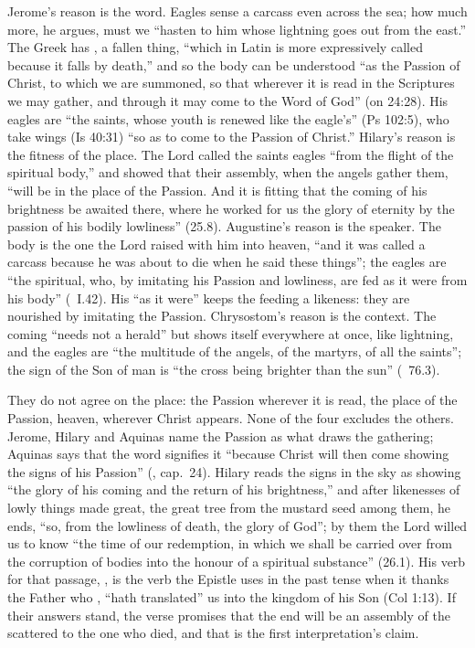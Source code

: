 Jerome's reason is the word. Eagles sense a carcass even across the sea; how
much more, he argues, must we ``hasten to him whose lightning goes out from
the east.'' The Greek has , a fallen thing, ``which in Latin is
more expressively called  because it falls by death,'' and so
the body can be understood ``as the Passion of Christ, to which we are
summoned, so that wherever it is read in the Scriptures we may gather, and
through it may come to the Word of God'' (on 24:28). His eagles are ``the
saints, whose youth is renewed like the eagle's'' (Ps 102:5), who take wings
(Is 40:31) ``so as to come to the Passion of Christ.'' Hilary's reason is the
fitness of the place. The Lord called the saints eagles ``from the flight of
the spiritual body,'' and showed that their assembly, when the angels gather
them, ``will be in the place of the Passion. And it is fitting that the coming
of his brightness be awaited there, where he worked for us the glory of
eternity by the passion of his bodily lowliness'' (25.8). Augustine's reason
is the speaker. The body is the one the Lord raised with him into heaven, ``and
it was called a carcass because he was about to die when he said these
things''; the eagles are ``the spiritual, who, by imitating his Passion and
lowliness, are fed as it were from his body'' (~I.42). His ``as it were'' keeps the feeding a likeness: they are
nourished by imitating the Passion. Chrysostom's reason is the context. The
coming ``needs not a herald'' but shows itself everywhere at once, like
lightning, and the eagles are ``the multitude of the angels, of the martyrs,
of all the saints''; the sign of the Son of man is ``the cross being brighter
than the sun'' (~76.3).

They do not agree on the place: the Passion wherever it is read, the place of
the Passion, heaven, wherever Christ appears. None of the four excludes the
others. Jerome, Hilary and Aquinas name the Passion as what draws the
gathering; Aquinas says that the word  signifies it ``because
Christ will then come showing the signs of his Passion'' (, cap.~24). Hilary reads the signs in the sky as showing ``the glory
of his coming and the return of his brightness,'' and after likenesses of
lowly things made great, the great tree from the mustard seed among them, he
ends, ``so, from the lowliness of death, the glory of God''; by them the Lord willed
us to know ``the time of our redemption, in which we shall be carried over
from the corruption of bodies into the honour of a spiritual substance''
(26.1). His verb for that passage, , is the verb the
Epistle uses in the past tense when it thanks the Father who
, ``hath translated'' us into the kingdom of his Son (Col
1:13). If their answers stand, the verse promises that the end will be an
assembly of the scattered to the one who died, and that is the first
interpretation's claim.

